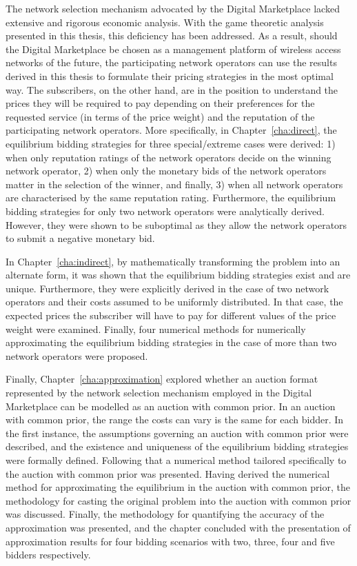 The network selection mechanism advocated by the Digital Marketplace lacked extensive and rigorous economic analysis. With the game theoretic analysis presented in this thesis, this deficiency has been addressed. As a result, should the Digital Marketplace be chosen as a management platform of wireless access networks of the future, the participating network operators can use the results derived in this thesis to formulate their pricing strategies in the most optimal way. The subscribers, on the other hand, are in the position to understand the prices they will be required to pay depending on their preferences for the requested service (in terms of the price weight) and the reputation of the participating network operators. More specifically, in Chapter~\ref{cha:direct}, the equilibrium bidding strategies for three special/extreme cases were derived: 1) when only reputation ratings of the network operators decide on the winning network operator, 2) when only the monetary bids of the network operators matter in the selection of the winner, and finally, 3) when all network operators are characterised by the same reputation rating. Furthermore, the equilibrium bidding strategies for only two network operators were analytically derived. However, they were shown to be suboptimal as they allow the network operators to submit a negative monetary bid.

In Chapter~\ref{cha:indirect}, by mathematically transforming the problem into an alternate form, it was shown that the equilibrium bidding strategies exist and are unique. Furthermore, they were explicitly derived in the case of two network operators and their costs assumed to be uniformly distributed. In that case, the expected prices the subscriber will have to pay for different values of the price weight were examined. Finally, four numerical methods for numerically approximating the equilibrium bidding strategies in the case of more than two network operators were proposed.

Finally, Chapter~\ref{cha:approximation} explored whether an auction format represented by the network selection mechanism employed in the Digital Marketplace can be modelled as an auction with common prior. In an auction with common prior, the range the costs can vary is the same for each bidder. In the first instance, the assumptions governing an auction with common prior were described, and the existence and uniqueness of the equilibrium bidding strategies were formally defined. Following that a numerical method tailored specifically to the auction with common prior was presented. Having derived the numerical method for approximating the equilibrium in the auction with common prior, the methodology for casting the original problem into the auction with common prior was discussed. Finally, the methodology for quantifying the accuracy of the approximation was presented, and the chapter concluded with the presentation of approximation results for four bidding scenarios with two, three, four and five bidders respectively.

